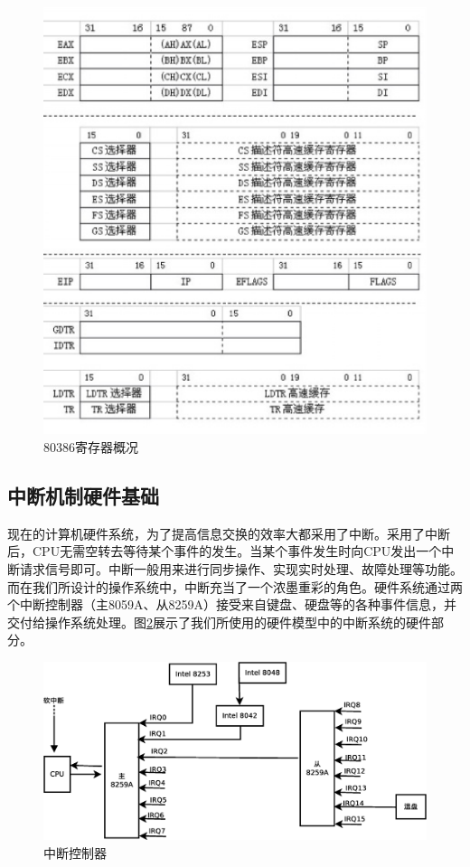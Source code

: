 \documentclass[UTF8,nofonts,cs4size]{ctexrep}
\begin{document}
\begin{figure}[htp]
\centering
\includegraphics[scale=1]{80386.eps}
\caption{80386寄存器概况}
\label{80386}
\end{figure}


\subsection{中断机制硬件基础}
现在的计算机硬件系统，为了提高信息交换的效率大都采用了中断。采用了中断后，CPU无需空转去等待某个事件的发生。当某个事件发生时向CPU发出一个中断请求信号即可。中断一般用来进行同步操作、实现实时处理、故障处理等功能。而在我们所设计的操作系统中，中断充当了一个浓墨重彩的角色。硬件系统通过两个中断控制器（主8059A、从8259A）接受来自键盘、硬盘等的各种事件信息，并交付给操作系统处理。图\ref{interrupt}展示了我们所使用的硬件模型中的中断系统的硬件部分。
\begin{figure}[htp]
\centering
\includegraphics[scale=0.38]{interrupt.eps}
\caption{中断控制器}
\label{interrupt}
\end{figure}
\end{document}
